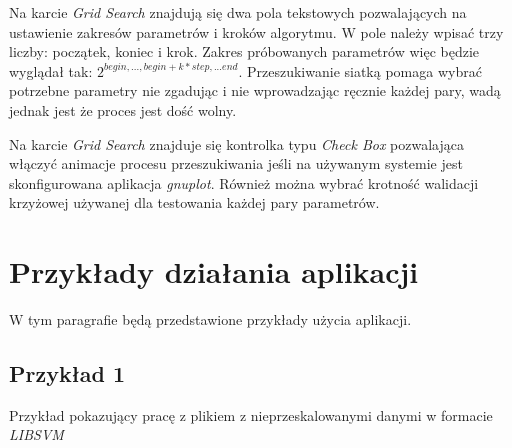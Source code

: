 \documentclass[paper=a4, fontsize=11pt]{scrartcl} %
\numberwithin{equation}{section} %
\numberwithin{figure}{section} %
\begin{document}
    \par Na karcie \textit{Grid Search} znajdują się dwa pola tekstowych pozwalających na ustawienie
    zakresów parametrów i kroków algorytmu. W pole należy wpisać trzy liczby: początek, koniec
    i krok. Zakres próbowanych parametrów więc będzie wyglądał tak:
    $2^{begin,...,begin+k*step,...end}$. Przeszukiwanie siatką pomaga wybrać potrzebne
    parametry nie zgadując i nie wprowadzając ręcznie każdej pary, wadą jednak jest że proces
    jest dość wolny. 
    \par Na karcie \textit{Grid Search} znajduje się kontrolka typu \textit{Check Box}
    pozwalająca włączyć animacje procesu przeszukiwania jeśli na używanym systemie jest
    skonfigurowana aplikacja \textit{gnuplot}. Również można wybrać krotność walidacji
    krzyżowej używanej dla testowania każdej pary parametrów. 

\newpage
\section{Przykłady działania aplikacji}
    \par W tym paragrafie będą przedstawione przykłady użycia aplikacji. 

\subsection{Przykład 1}
    \par Przykład pokazujący pracę z plikiem z nieprzeskalowanymi danymi w formacie
    \textit{LIBSVM}
\end{document}
